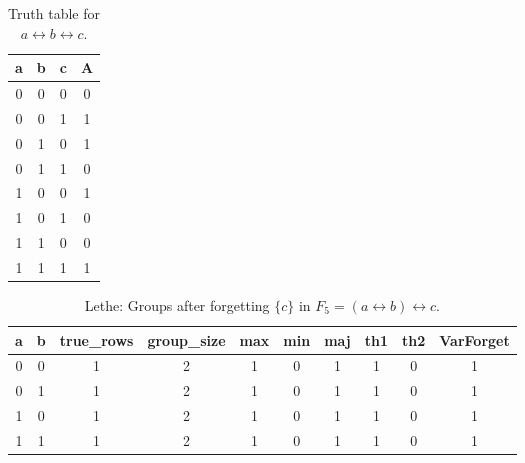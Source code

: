 \begin{table}[!tb]
    \centering
    \begin{tabular}{|c|c|c|c|}
        \hline
        \textbf{a} & \textbf{b} & \textbf{c} & \textbf{A} \\ \hline
        0 & 0 & 0 & 0 \\ \hline
        0 & 0 & 1 & 1 \\ \hline
        0 & 1 & 0 & 1 \\ \hline
        0 & 1 & 1 & 0 \\ \hline
        1 & 0 & 0 & 1 \\ \hline
        1 & 0 & 1 & 0 \\ \hline
        1 & 1 & 0 & 0 \\ \hline
        1 & 1 & 1 & 1 \\ \hline
    \end{tabular}
    \caption{Truth table for $a \leftrightarrow b \leftrightarrow c$.}
    \label{tab:truthtab}
\end{table}

\begin{table}[!tb]
    \centering
    \begin{tabular}{|c|c|c|c|c|c|c|c|c|c|}
        \hline
        \textbf{a} & \textbf{b} & \textbf{true\_rows} & \textbf{group\_size} & \textbf{max} & \textbf{min} & \textbf{maj} & \textbf{th1} & \textbf{th2} & \textbf{VarForget} \\ \hline
        \rowcolor{gray!40} 0 & 0 & 1 & 2 & 1 & 0 & 1 & 1 & 0 & 1 \\ \hline
        \rowcolor{blue!40} 0 & 1 & 1 & 2 & 1 & 0 & 1 & 1 & 0 & 1 \\ \hline
        \rowcolor{red!40} 1 & 0 & 1 & 2 & 1 & 0 & 1 & 1 & 0 & 1 \\ \hline
        \rowcolor{green!40} 1 & 1 & 1 & 2 & 1 & 0 & 1 & 1 & 0 & 1 \\ \hline
    \end{tabular}
    \caption{Lethe: Groups after forgetting $\{c\}$ in $F_{5} = (a \leftrightarrow b) \leftrightarrow c$.}
    \label{tab:lethe-F5-c-groups}
\end{table}
